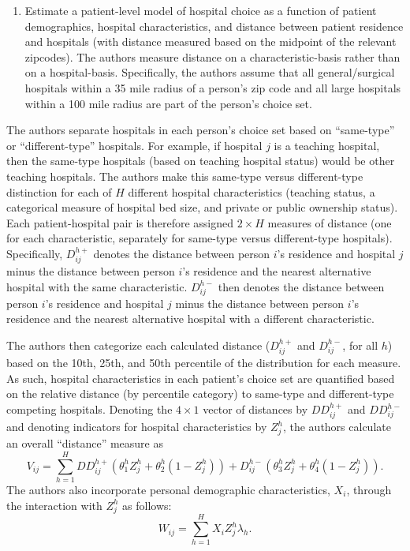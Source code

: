 \documentclass[
  letterpaper,
  DIV=11,
  numbers=noendperiod]{scrreport}
\providecommand{\tightlist}{%
  \setlength{\itemsep}{0pt}\setlength{\parskip}{0pt}}\usepackage{longtable,booktabs,array}
\theoremstyle{definition}
\theoremstyle{remark}
\begin{document}
\begin{enumerate}
\def\labelenumi{\arabic{enumi}.}
\tightlist
\item
  Estimate a patient-level model of hospital choice as a function of
  patient demographics, hospital characteristics, and distance between
  patient residence and hospitals (with distance measured based on the
  midpoint of the relevant zipcodes). The authors measure distance on a
  characteristic-basis rather than on a hospital-basis. Specifically,
  the authors assume that all general/surgical hospitals within a 35
  mile radius of a person's zip code and all large hospitals within a
  100 mile radius are part of the person's choice set.
\end{enumerate}

The authors separate hospitals in each person's choice set based on
``same-type'' or ``different-type'' hospitals. For example, if hospital
\(j\) is a teaching hospital, then the same-type hospitals (based on
teaching hospital status) would be other teaching hospitals. The authors
make this same-type versus different-type distinction for each of \(H\)
different hospital characteristics (teaching status, a categorical
measure of hospital bed size, and private or public ownership status).
Each patient-hospital pair is therefore assigned \(2\times H\) measures
of distance (one for each characteristic, separately for same-type
versus different-type hospitals). Specifically, \(D_{ij}^{h+}\) denotes
the distance between person \(i\)'s residence and hospital \(j\) minus
the distance between person \(i\)'s residence and the nearest
alternative hospital with the same characteristic. \(D_{ij}^{h-}\) then
denotes the distance between person \(i\)'s residence and hospital \(j\)
minus the distance between person \(i\)'s residence and the nearest
alternative hospital with a different characteristic.

The authors then categorize each calculated distance (\(D_{ij}^{h+}\)
and \(D_{ij}^{h-}\), for all \(h\)) based on the 10th, 25th, and 50th
percentile of the distribution for each measure. As such, hospital
characteristics in each patient's choice set are quantified based on the
relative distance (by percentile category) to same-type and
different-type competing hospitals. Denoting the \(4 \times 1\) vector
of distances by \(DD_{ij}^{h+}\) and \(DD_{ij}^{h-}\) and denoting
indicators for hospital characteristics by \(Z_{j}^{h}\), the authors
calculate an overall ``distance'' measure as
\[V_{ij}=\sum_{h=1}^{H} DD_{ij}^{h+} \left(\theta_{1}^{h}Z_{j}^{h} + \theta_{2}^{h}(1-Z_{j}^{h}) \right) + D_{ij}^{h-}\left( \theta_{3}^{h}Z_{j}^{h} + \theta_{4}^{h}(1-Z_{j}^{h}) \right).\]
The authors also incorporate personal demographic characteristics,
\(X_{i}\), through the interaction with \(Z_{j}^{h}\) as follows:
\[W_{ij} = \sum_{h=1}^{H} X_{i} Z_{j}^{h} \lambda_{h}.\]
\end{document}
